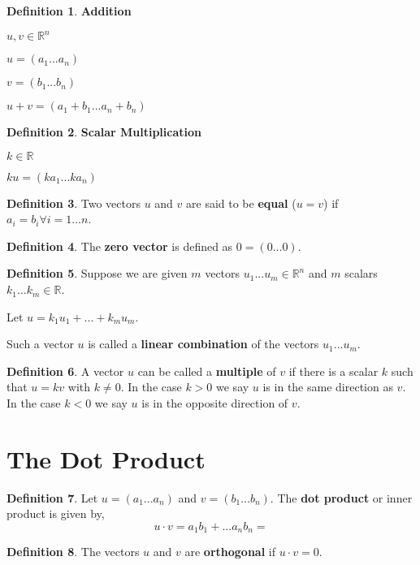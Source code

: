 \documentclass{report}
\theoremstyle{definition}
\newtheorem{_def}{Definition}
\begin{document}
\begin{_def}
\textbf{Addition}

\(u, v \in \mathbb{R}^n\)

\(u=(a_1...a_n)\) 

\(v=(b_1...b_n)\)

\(u+v=(a_1+b_1...a_n+b_n)\)
\end{_def}

\begin{_def}
\textbf{Scalar Multiplication}

\(k\in \mathbb{R}\)

\(ku=(ka_1...ka_n)\)
\end{_def}

\begin{_def}
Two vectors \(u\) and \(v\) are said to be \textbf{equal} (\(u=v\)) if \(a_i=b_i \forall i=1...n\).
\end{_def}

\begin{_def}
The \textbf{zero vector} is defined as \(0=(0...0)\).
\end{_def}

\begin{_def}
Suppose we are given \(m\) vectors \(u_1...u_m\in \mathbb{R}^n\) and \(m\) scalars \(k_1...k_m\in \mathbb{R}\).

Let \(u=k_1u_1+...+k_mu_m\).

Such a vector \(u\) is called a \textbf{linear combination} of the vectors \(u_1...u_m\).
\end{_def}

\begin{_def}
A vector \(u\) can be called a \textbf{multiple} of \(v\) if there is a scalar \(k\) such that \(u=kv\) with \(k\neq 0\). 
In the case \(k>0\) we say \(u\) is in the same direction as \(v\). 
In the case \(k<0\) we say \(u\) is in the opposite direction of \(v\).
\end{_def}

\section{The Dot Product}

\begin{_def}
Let \(u=(a_1...a_n)\) and \(v=(b_1...b_n)\). The \textbf{dot product} or inner product is given by,
\[u\cdot v=a_1b_1+...a_nb_n=\]
\end{_def}

\begin{_def}
The vectors \(u\) and \(v\) are \textbf{orthogonal} if \(u\cdot v=0\).
\end{_def}
\end{document}
